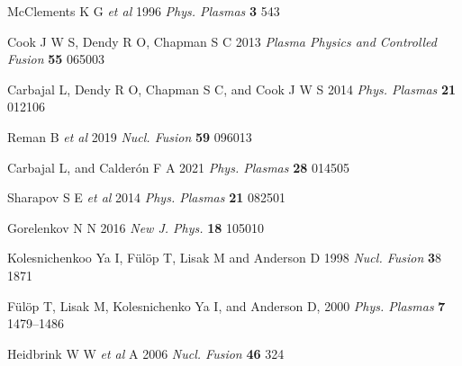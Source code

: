 \documentclass[12pt]{iopart}
\begin{document}
\begin{thebibliography}{9}
McClements K G \textit{et al} 1996 \textit{Phys. Plasmas} \textbf{3} 543

Cook J W S, Dendy R O, Chapman S C 2013 \textit{Plasma Physics and Controlled Fusion} \textbf{55} 065003

Carbajal L, Dendy R O, Chapman S C, and Cook J W S 2014 \textit{Phys. Plasmas} \textbf{21} 012106

Reman B \textit{et al} 2019 \textit{Nucl. Fusion} \textbf{59} 096013

Carbajal L, and Calderón F A 2021 \textit{Phys. Plasmas} \textbf{28} 014505

Sharapov S E \textit{et al} 2014 \textit{Phys. Plasmas} \textbf{21} 082501

Gorelenkov N N 2016 \textit{New J. Phys.} \textbf{18} 105010

Kolesnichenkoo Ya I, F{\"u}l{\"o}p T, Lisak M and Anderson D 1998 \textit{Nucl. Fusion} {\textbf 38} 1871

F{\"u}l{\"o}p T, Lisak M, Kolesnichenko Ya I, and Anderson D, 2000 \textit{Phys. Plasmas} \textbf{7} 1479–1486

Heidbrink W W \textit{et al} A 2006 \textit{Nucl. Fusion} \textbf{46} 324


\end{thebibliography}
\end{document}
